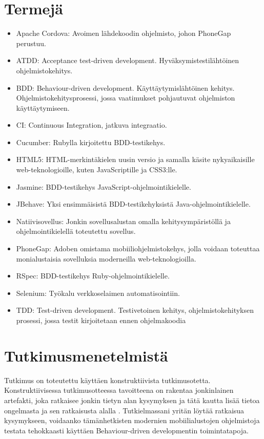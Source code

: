 \documentclass[finnish,nonumbib,nocopyright]{gradu2}
\begin{document}
\section{Termejä}
\begin{itemize}
\item Apache Cordova: Avoimen lähdekoodin ohjelmisto, johon PhoneGap perustuu.
\item ATDD: Acceptance test-driven development. Hyväksymistestilähtöinen ohjelmistokehitys.
\item BDD: Behaviour-driven development. Käyttäytymislähtöinen kehitys. Ohjelmistokehitysprosessi, jossa vaatimukset pohjautuvat ohjelmiston käyttäytymiseen.
\item CI: Continuous Integration, jatkuva integraatio.
\item Cucumber: Rubylla kirjoitettu BDD-testikehys.
\item HTML5: HTML-merkintäkielen uusin versio ja samalla käsite nykyaikaisille web-teknologioille, kuten JavaScriptille ja CSS3:lle.
\item Jasmine: BDD-testikehys JavaScript-ohjelmointikielelle.
\item JBehave: Yksi ensimmäisistä BDD-testikehyksistä Java-ohjelmointikielelle.
\item Natiivisovellus: Jonkin sovellusalustan omalla kehitysympäristöllä ja ohjelmointikielellä toteutettu sovellus.
\item PhoneGap: Adoben omistama mobiiliohjelmistokehys, jolla voidaan toteuttaa monialustaisia sovelluksia moderneilla web-teknologioilla.
\item RSpec: BDD-testikehys Ruby-ohjelmointikielelle.
\item Selenium: Työkalu verkkoselaimen automatisointiin.
\item TDD: Test-driven development. Testivetoinen kehitys, ohjelmistokehityksen prosessi, jossa testit kirjoitetaan ennen ohjelmakoodia
\end{itemize}

\section{Tutkimusmenetelmistä}
Tutkimus on toteutettu käyttäen konstruktiivista tutkimusotetta. Konstruktiivisessa tutkimusotteessa tavoitteena on rakentaa jonkinlainen artefakti, joka ratkaisee jonkin tietyn alan kysymyksen ja tätä kautta lisää tietoa ongelmasta ja sen ratkaisusta alalla \cite{constructive}. Tutkielmassani yritän löytää ratkaisua kysymykseen, voidaanko tämänhetkisten modernien mobiilialustojen ohjelmistoja testata tehokkaasti käyttäen Behaviour-driven developmentin toimintatapoja.
\end{document}
